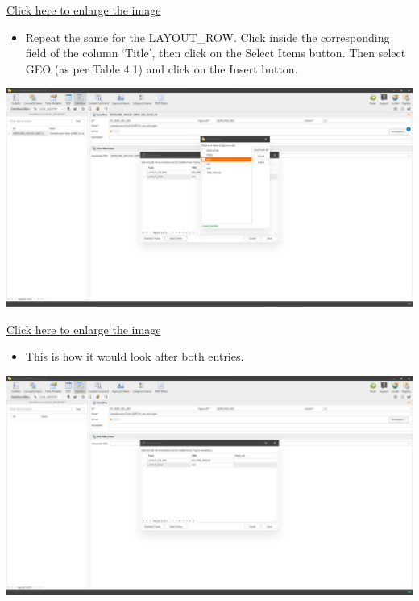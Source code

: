 \documentclass[
]{book}
\providecommand{\tightlist}{%
  \setlength{\itemsep}{0pt}\setlength{\parskip}{0pt}}
\begin{document}
\href{images/image262.png}{Click here to enlarge the image}

\begin{itemize}
\tightlist
\item
  Repeat the same for the LAYOUT\_ROW. Click inside the corresponding field of the column `Title', then click on the Select Items button. Then select GEO (as per Table 4.1) and click on the Insert button.
\end{itemize}

\begin{center}\includegraphics[width=1\linewidth]{./images/image263} \end{center}

\href{images/image263.png}{Click here to enlarge the image}

\begin{itemize}
\tightlist
\item
  This is how it would look after both entries.
\end{itemize}

\begin{center}\includegraphics[width=1\linewidth]{./images/image264} \end{center}
\end{document}
